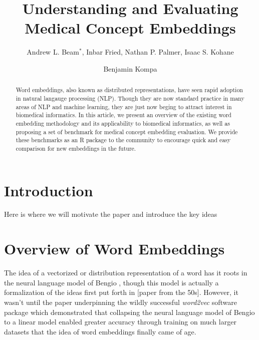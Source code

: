\documentclass{ws-procs11x85}
\begin{document}
\title{Understanding and Evaluating Medical Concept Embeddings}

\author{Andrew L. Beam$^*$, Inbar Fried, Nathan P. Palmer, Isaac S. Kohane}

\address{Department of Biomedical Informatics, Harvard Medical School,\\
Boston, MA, 02115, USA\\
$^*$E-mail: Andrew\_Beam@hms.harvard.edu\\
www.university\_name.edu}

\author{Benjamin Kompa}

\address{University of North Carolina, Chapel Hill,\\
Chapel Hill, North Carolina ZIP/Zone, USA\\
E-mail: an\_author@laboratory.com}

\begin{abstract}
Word embeddings, also known as distributed representations, have seen rapid adoption in natural langauge processing (NLP). Though they are now standard practice in many areas of NLP and machine learning, they are just now beging to attract interest in biomedical informatics. In this article, we present an overview of the existing word embedding methodology and its applicability to biomedical informatics, as well as proposing a set of benchmark for medical concept embedding evaluation. We provide these benchmarks as an R package to the community to encourage quick and easy comparison for new embeddings in the future.
\end{abstract}


\bodymatter

\section{Introduction}\label{aba:intro}
Here is where we will motivate the paper and introduce the key ideas

\section{Overview of Word Embeddings}\label{aba:intro}
The idea of a vectorized or distribution representation of a word has it roots in the neural language model of Bengio \cite{bengio2003neural}, though this model is actually a formalization of the ideas first put forth in [paper from the 50s]. However, it wasn't until the paper\cite{mikolov2013distributed} underpinning the wildly successful \emph{word2vec} software package which demonstrated that collapsing the neural language model of Bengio\cite{bengio2003neural} to a linear model enabled greater accuracy through training on much larger datasets that the idea of word embeddings finally came of age.
\end{document}
